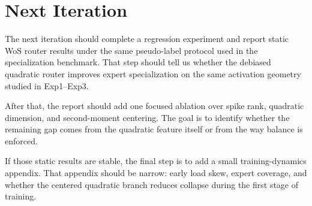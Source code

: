 \documentclass[11pt]{article}
\begin{document}
\section{Next Iteration}

The next iteration should complete a regression experiment and report static WoS router results under the same pseudo-label protocol used in the specialization benchmark. That step should tell us whether the debiased quadratic router improves expert specialization on the same activation geometry studied in Exp1--Exp3.

After that, the report should add one focused ablation over spike rank, quadratic dimension, and second-moment centering. The goal is to identify whether the remaining gap comes from the quadratic feature itself or from the way balance is enforced.

If those static results are stable, the final step is to add a small training-dynamics appendix. That appendix should be narrow: early load skew, expert coverage, and whether the centered quadratic branch reduces collapse during the first stage of training.
\end{document}
